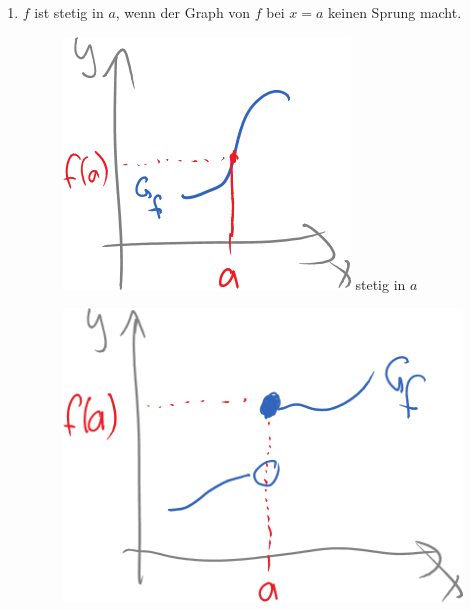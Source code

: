 \Bem
\begin{enumerate}
	\item $f$ ist stetig in $a$, wenn der Graph von $f$ bei $x=a$ keinen {\flqq Sprung\frqq} macht.
	\begin{figure}
		\begin{minipage}{0.3\linewidth}
			\centering
			\includegraphics[width=\linewidth]{Bilder/137}
			stetig in $a$
		\end{minipage}
		\quad
		\begin{minipage}{0.3\linewidth}
			\centering
			\includegraphics[width=\linewidth]{Bilder/138}

\end{minipage}
\end{figure}
\end{enumerate}
